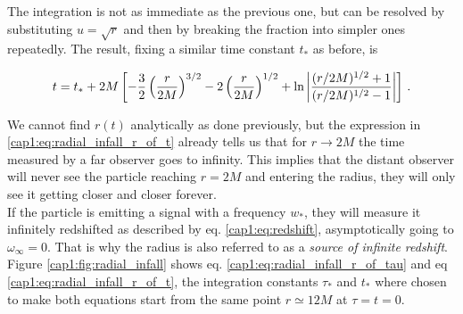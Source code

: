 The integration is not as immediate as the previous one, but can be resolved
by substituting $u = \sqrt{r}$ and then by breaking the fraction into simpler
ones repeatedly.
The result, fixing a similar time constant $t_*$ as before, is

\begin{equation}
    t = t_* + 2M \left[ -\frac{3}{2} \left(\frac{r}{2M}\right)^{3/2}
    - 2 \left(\frac{r}{2M}\right)^{1/2}
    + \ln \abs{\frac{(r/2M)^{1/2} + 1}{(r/2M)^{1/2} - 1}} \right] \, .
    \label{cap1:eq:radial_infall_r_of_t}
\end{equation}

We cannot find $r(t)$ analytically as done previously, but the expression
in \ref{cap1:eq:radial_infall_r_of_t} already tells us that for
$r \rightarrow 2M$ the time measured by a far observer goes to infinity.
This implies that the distant observer will never see the particle reaching
$r = 2M$ and entering the \Sh radius, they will only see it getting closer and
closer forever. \\
If the particle is emitting a signal with a frequency $w_*$, they will measure
it infinitely redshifted as described by eq. \ref{cap1:eq:redshift},
asymptotically going to $\omega_\infty = 0$.
That is why the \Sh radius is also referred to as a
\textit{source of infinite redshift}. \\
Figure \ref{cap1:fig:radial_infall} shows eq.
\ref{cap1:eq:radial_infall_r_of_tau} and eq
\ref{cap1:eq:radial_infall_r_of_t}, the integration constants $\tau_*$ and
$t_*$ where chosen to make both equations start from the same point
$r \simeq 12M$ at $\tau = t =  0$.

